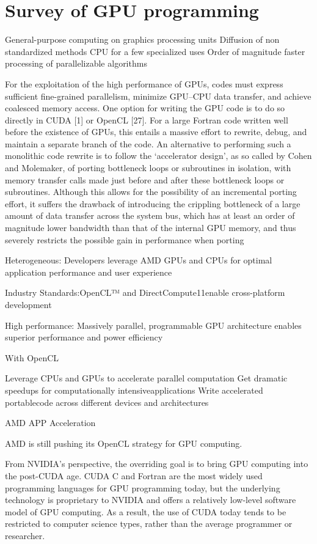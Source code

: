 \chapter{Survey of GPU programming}

General-purpose computing on graphics processing units 	Diffusion of non standardized methods 	CPU for a few specialized uses 	Order of magnitude faster processing of parallelizable algorithms

For the exploitation of the high performance of GPUs, codes must express sufficient fine-grained parallelism, minimize GPU–CPU data transfer, and achieve coalesced memory access. One option for writing the GPU code is to do so directly in CUDA [1] or OpenCL [27]. For a large Fortran code written well before the existence of GPUs, this entails a massive effort to rewrite, debug, and maintain a separate branch of the code. An alternative to performing such a monolithic code rewrite is to follow the ‘accelerator design’, as so called by Cohen and Molemaker, of porting bottleneck loops or subroutines in isolation, with memory transfer calls made just before and after these bottleneck loops or subroutines. Although this allows for the possibility of an incremental porting effort, it suffers the drawback of introducing the crippling bottleneck of a large amount of data transfer across the system bus, which has at least an order of magnitude lower bandwidth than that of the internal GPU memory, and thus severely restricts the possible gain in performance when porting

Heterogeneous: Developers leverage AMD GPUs and CPUs for optimal application performance and user experience

Industry Standards:OpenCL™ and DirectCompute11enable cross-platform development

High performance: Massively parallel, programmable GPU architecture enables superior performance and power efficiency

With OpenCL

Leverage CPUs and GPUs to accelerate parallel computation
Get dramatic speedups for computationally intensiveapplications
Write accelerated portablecode across different devices and architectures


AMD APP Acceleration 


AMD is still pushing its OpenCL strategy for GPU computing. 

From NVIDIA's perspective, the overriding goal is to bring GPU computing into the post-CUDA age.  CUDA C and Fortran are the most widely used programming languages for GPU programming today, but the underlying technology is proprietary to NVIDIA and offers a relatively low-level software model of GPU computing. As a result, the use of CUDA today tends to be restricted to computer science types, rather than the average programmer or researcher.

